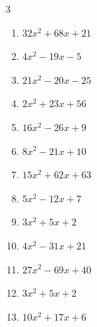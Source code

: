


\setcounter{quesnum}{30}

\begin{multicols}{3}
\begin{enumerate}
  \itemsep=30pt
  \item $32x^{2}+68x+21$

        \phantom{$=(8x+3)(4x+7)$}

  \item $4x^{2}-19x-5$

        \phantom{$=(x-5)(4x+1)$}

  \item $21x^{2}-20x-25$

        \phantom{$=(7x+5)(3x-5)$}

  \item $2x^{2}+23x+56$

        \phantom{$=(x+8)(2x+7)$}

  \item $16x^{2}-26x+9$

        \phantom{$=(8x-9)(2x-1)$}

  \item $8x^{2}-21x+10$

        \phantom{$=(x-2)(8x-5)$}

  \item $15x^{2}+62x+63$

        \phantom{$=(3x+7)(5x+9)$}

  \item $5x^{2}-12x+7$

        \phantom{$=(5x-7)(x-1)$}

  \item $3x^{2}+5x+2$

        \phantom{$=(x+1)(3x+2)$}

  \item $4x^{2}-31x+21$

        \phantom{$=(4x-3)(x-7)$}

\columnbreak %

  \item $27x^{2}-69x+40$

        \phantom{$=(9x-8)(3x-5)$}

  \item $3x^{2}+5x+2$

        \phantom{$=(x+1)(3x+2)$}

  \item $10x^{2}+17x+6$


\end{enumerate}
\end{multicols}
